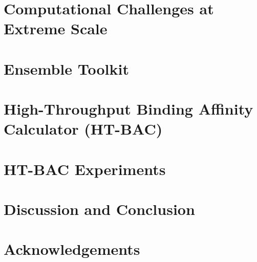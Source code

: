 \documentclass[conference]{IEEEtran}
\begin{document}
\section{Computational Challenges at Extreme Scale}
\label{sec:3}






\section{Ensemble Toolkit}
\label{sec:4}




\section{High-Throughput Binding Affinity Calculator (HT-BAC)}
\label{sec:5}



\section{HT-BAC Experiments}
\label{sec:6}


\section{Discussion and Conclusion}
\label{sec:conclusion}



\section*{Acknowledgements}
\label{sec:ack}





\end{document}
